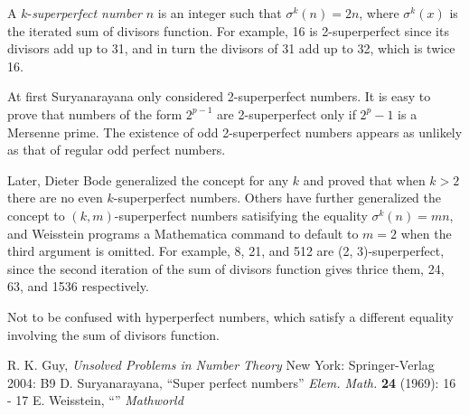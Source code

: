 \documentclass[12pt]{article}
\begin{document}
A $k$-{\em superperfect number} $n$ is an integer such that $\sigma^k(n) = 2n$, where $\sigma^k(x)$ is the iterated sum of divisors function. For example, 16 is 2-superperfect since its divisors add up to 31, and in turn the divisors of 31 add up to 32, which is twice 16.

At first Suryanarayana only considered 2-superperfect numbers. It is easy to prove that numbers of the form $2^{p - 1}$ are 2-superperfect only if $2^p - 1$ is a Mersenne prime. The existence of odd 2-superperfect numbers appears as unlikely as that of regular odd perfect numbers.

Later, Dieter Bode generalized the concept for any $k$ and proved that when $k > 2$ there are no even $k$-superperfect numbers. Others have further generalized the concept to $(k, m)$-superperfect numbers satisifying the equality $\sigma^k(n) = mn$, and Weisstein programs a Mathematica command to default to $m = 2$ when the third argument is omitted. For example, 8, 21, and 512 are (2, 3)-superperfect, since the second iteration of the sum of divisors function gives thrice them, 24, 63, and 1536 respectively.

Not to be confused with hyperperfect numbers, which satisfy a different equality involving the sum of divisors function.

\begin{thebibliography}{3}
 R. K. Guy, {\it Unsolved Problems in Number Theory} New York: Springer-Verlag 2004: B9
 D. Suryanarayana, ``Super perfect numbers'' {\it Elem. Math.} {\bf 24} (1969): 16 - 17
 E. Weisstein, ``'' {\it Mathworld}
\end{thebibliography}
\end{document}
